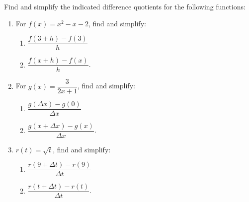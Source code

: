 \begin{ex}  \label{differencequotientex} Find and simplify the indicated difference quotients for the following functions:

\begin{enumerate}

\item  For $f(x) = x^2-x-2$, find and simplify:   

\begin{multicols}{2}

\begin{enumerate}

\item  $\dfrac{f(3+h)-f(3)}{h}$ 

\item  $\dfrac{f(x+h)-f(x)}{h}$.

\end{enumerate}

\end{multicols}

\item  For $g(x) = \dfrac{3}{2x+1}$, find and simplify:

\begin{multicols}{2}

\begin{enumerate}

\item  $\dfrac{g(\Delta x)-g(0)}{\Delta x}$ 
 
\item  $\dfrac{g(x+\Delta x)-g(x)}{\Delta x}$.

\end{enumerate}

\end{multicols}


\item  $r(t) = \sqrt{t}$,  find and simplify:  


\begin{multicols}{2}

\begin{enumerate}

\item $\dfrac{r(9+\Delta t)-r(9)}{\Delta t}$ 

 \item $\dfrac{r(t+\Delta t)- r(t)}{\Delta t}$.
 
 \end{enumerate}

\end{multicols}



\end{enumerate}
\end{ex}
